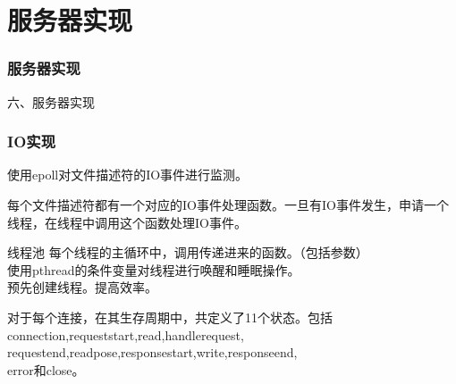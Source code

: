\documentclass[10pt,dvipdfm]{beamer}
\begin{document}
\section{服务器实现}

\begin{frame}
	\frametitle{服务器实现}
	\begin{center}
	{\Large
		六、服务器实现
	}
	\end{center}
\end{frame}

\begin{frame}
	\frametitle{IO实现}
	使用epoll对文件描述符的IO事件进行监测。
	
	每个文件描述符都有一个对应的IO事件处理函数。一旦有IO事件发生，申请一个线程，在线程中调用这个函数处理IO事件。
	
	\pause
	\begin{block}{线程池}
		每个线程的主循环中，调用传递进来的函数。（包括参数）\\
		使用pthread的条件变量对线程进行唤醒和睡眠操作。\\
		预先创建线程。提高效率。
	\end{block}
	
	\pause
	
	对于每个连接，在其生存周期中，共定义了11个状态。包括connection,requeststart,read,handlerequest, \\requestend,readpose,responsestart,write,responseend,\\error和close。
\end{frame}
\end{document}
